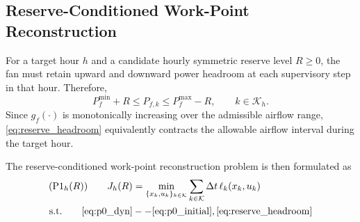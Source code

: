 \documentclass[journal]{IEEEtran}
\theoremstyle{remark}
\begin{document}
	
	
	\subsection{Reserve-Conditioned Work-Point Reconstruction}
	\label{subsec:work_point_reconstruction}
	
	For a target hour \(h\) and a candidate hourly symmetric reserve level
	\(R\ge0\), the fan must retain upward and downward power headroom at
	each supervisory step in that hour. Therefore,
	\begin{equation}
		P_f^{\min}+R
		\le
		P_{f,k}
		\le
		P_f^{\max}-R,
		\qquad
		k\in\mathcal{K}_h .
		\label{eq:reserve_headroom}
	\end{equation}
	Since \(g_f(\cdot)\) is monotonically increasing over the admissible
	airflow range, \eqref{eq:reserve_headroom} equivalently contracts the
	allowable airflow interval during the target hour.
	
	The reserve-conditioned work-point reconstruction problem is then
	formulated as
	\begin{subequations}
		\label{prob:P1}
		\begin{align}
			(\mathrm{P1}_h(R))\qquad
			J_h(R)
			&=
			\min_{\{x_k,u_k\}_{k\in\mathcal{K}}}
			\sum_{k\in\mathcal{K}}
			\Delta t\,\ell_k(x_k,u_k)
			\label{eq:p1_obj}\\
			\mathrm{s.t.}\qquad
			\eqref{eq:p0_dyn}&--\eqref{eq:p0_initial},\eqref{eq:reserve_headroom}
		\end{align}
	\end{subequations}
	
\end{document}
